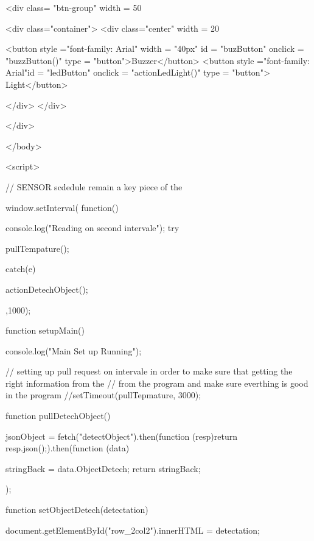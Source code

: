 	<div class= "btn-group" width = 50%
		
		<div class="container">
			<div class="center" width = 20%
		
  
  <button style ="font-family: Arial" width = "40px" id = "buzButton" onclick = "buzzButton()" type = "button">Buzzer</button>
	<button style ="font-family: Arial"id = "ledButton" onclick = "actionLedLight()" type = "button">   Light</button>
  
  </div>
</div>
	
	
	
	</div>
	
	
</body>

<script>


	// SENSOR scdedule remain a key piece of the
	
	window.setInterval(
		function(){
			console.log("Reading on second intervale");
			try { 
				
				
				pullTempature();
			}catch(e) {
				
			}
			
			actionDetechObject();
			
		}
		
	,1000);
	
	
	function setupMain() { 
		
		console.log("Main Set up Running");
		
		
		// setting up pull request on intervale in order to make sure that getting the right information from the 
		// from the program and make sure everthing is good in the program
		//setTimeout(pullTepmature, 3000);
	}
	
	
	
	function pullDetechObject()  { 
		
			jsonObject = fetch("detectObject").then(function (resp){return resp.json();}).then(function (data){
				
					
				
					stringBack = data.ObjectDetech; 
					return stringBack;
				
					
				}
			
			
			
			
			);
			
			
	
		
			
		
	}
	
	
	function setObjectDetech(detectation){ 
		
		
		document.getElementById("row_2col2").innerHTML = detectation;
		
	}
	
